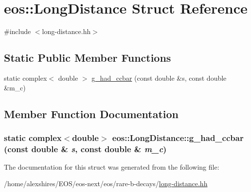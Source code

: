 \hypertarget{structeos_1_1LongDistance}{
\section{eos::LongDistance Struct Reference}
\label{structeos_1_1LongDistance}
}


{\ttfamily \#include $<$long-\/distance.hh$>$}\subsection*{Static Public Member Functions}
\begin{DoxyCompactItemize}
\item 
static complex$<$ double $>$ \hyperlink{structeos_1_1LongDistance_a06532a8a99890b06046532e3d05317d0}{g\_\-had\_\-ccbar} (const double \&s, const double \&m\_\-c)
\end{DoxyCompactItemize}


\subsection{Member Function Documentation}
\hypertarget{structeos_1_1LongDistance_a06532a8a99890b06046532e3d05317d0}{
\subsubsection[{g\_\-had\_\-ccbar}]{\setlength{\rightskip}{0pt plus 5cm}static complex$<$double$>$ eos::LongDistance::g\_\-had\_\-ccbar (const double \& {\em s}, \/  const double \& {\em m\_\-c})}}
\label{structeos_1_1LongDistance_a06532a8a99890b06046532e3d05317d0}


The documentation for this struct was generated from the following file:\begin{DoxyCompactItemize}
\item 
/home/alexshires/EOS/eos-\/next/eos/rare-\/b-\/decays/\hyperlink{long-distance_8hh}{long-\/distance.hh}\end{DoxyCompactItemize}
